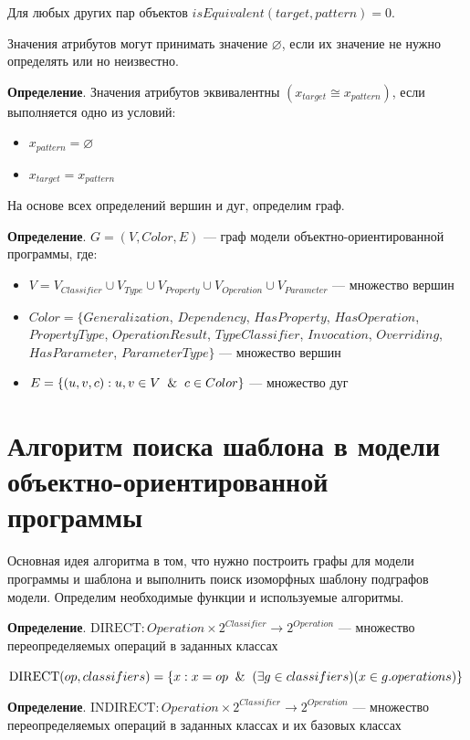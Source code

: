 Для любых других пар объектов $isEquivalent(target, pattern) = 0$.

Значения атрибутов могут принимать значение $\varnothing$,
если их значение не нужно определять или но неизвестно.

\textbf{Определение}. Значения атрибутов эквивалентны
$(x_{target} \cong x_{pattern})$, если выполняется одно из условий:
\begin{itemize}
\item $x_{pattern} = \varnothing$
\item $x_{target} = x_{pattern}$
\end{itemize}

На основе всех определений вершин и дуг, определим граф.

\textbf{Определение}. $G = (V, Color, E)$ --- граф модели объектно-ориентированной программы, где:
\begin{itemize}
\item $V = V_{Classifier} \cup V_{Type} \cup V_{Property} \cup V_{Operation} \cup V_{Parameter}$
--- множество вершин
\item $Color = \{ Generalization$, $Dependency$, $HasProperty$, $HasOperation$,
$PropertyType$, $OperationResult$, $TypeClassifier$, $Invocation$, $Overriding$,
$HasParameter$, $ParameterType \}$  --- множество вершин
\item $E = \{ (u, v, c) : u, v \in V \And c \in Color \}$ --- множество дуг
\end{itemize}

\section{Алгоритм поиска шаблона в модели объектно-ориентированной программы}

Основная идея алгоритма в том, что нужно построить графы для модели программы
и шаблона и выполнить поиск изоморфных шаблону подграфов модели.
Определим необходимые функции и используемые алгоритмы.

\textbf{Определение}. $\textrm{DIRECT}: Operation \times 2^{Classifier} \to 2^{Operation}$
--- множество переопределяемых операций в заданных классах

$\textrm{DIRECT}(op, classifiers) = \{ x : x = op \And (\exists g \in classifiers)(x \in g.operations) \}$

\textbf{Определение}. $\textrm{INDIRECT}: Operation \times 2^{Classifier} \to 2^{Operation}$
--- множество переопределяемых операций в заданных классах и их базовых классах

